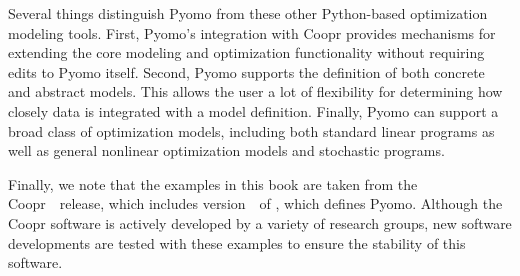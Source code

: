 Several things distinguish Pyomo from these other Python-based
optimization modeling tools.  First, Pyomo's integration with Coopr
provides mechanisms for extending the core modeling and optimization
functionality without requiring edits to Pyomo itself.  Second,
Pyomo supports the definition of both concrete and abstract models.
This allows the user a lot of flexibility for determining how closely
data is integrated with a model definition.  Finally, Pyomo can support
a broad class of optimization models, including both standard linear
programs as well as general nonlinear optimization models and stochastic programs.

Finally, we note that the examples in this book are taken from the
Coopr~\CooprVersion\ release, which includes version~\PyomoVersion\ of
, which defines Pyomo.  Although the Coopr software
is actively developed by a variety of research groups, new software
developments are tested with these examples to ensure the stability of
this software.

